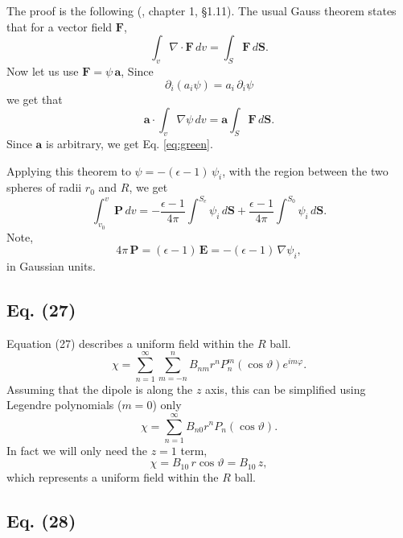 \documentclass[11pt]{article}
\newcommand{\vct}[1]{\boldsymbol{\mathbf{#1}}}
\newcommand{\vE}{\vct{E}}
\newcommand{\vP}{\vct{P}}
\begin{document}
The proof is the following (\cite{arfken}, chapter 1, \S 1.11).
%
The usual Gauss theorem states that
for a vector field $\vct F$,
\begin{equation}
  \int_v \nabla \cdot \vct F \, dv
=
  \int_S \vct F \vct \, d\vct S.
\end{equation}
%
Now let us use $\vct F = \psi \, \vct a$,
Since
\[
  \partial_i (a_i \psi)
= a_i \, \partial_i \psi
\]
we get that
\[
  \vct a \cdot \int_v \nabla \psi \, dv
=
  \vct a \int_S \vct F \vct \, d\vct S.
\]
Since $\vct a$ is arbitrary,
we get Eq. \eqref{eq:green}.

Applying this theorem to $\psi = -(\epsilon - 1) \, \psi_i$,
with the region between the two spheres
of radii $r_0$ and $R$,
we get
\begin{equation}
  \int_{v_0}^v \vP \, dv
=
  -\frac{\epsilon - 1}{4 \pi}
  \int^{S_e} \psi_i \, d\vct S
  +\frac{\epsilon - 1}{4 \pi}
  \int^{S_0} \psi_i \, d\vct S.
\end{equation}
Note,
\[
  4 \pi \, \vP
= (\epsilon - 1) \, \vE
= -(\epsilon - 1) \, \nabla \psi_i,
\]
in Gaussian units.



\subsection{Eq. (27)}



Equation (27) describes a uniform field within the $R$ ball.
\begin{equation}
  \chi
=
  \sum_{n = 1}^\infty
  \sum_{m = -n}^n
  B_{nm} r^n P_n^m(\cos\vartheta)e^{im \varphi}.
  \tag{27}
\end{equation}
%
Assuming that the dipole is along the $z$ axis,
this can be simplified using Legendre polynomials ($m = 0$) only
%
\begin{equation}
  \chi
=
  \sum_{n = 1}^\infty
  B_{n0} r^n P_n(\cos\vartheta).
  \tag{$27'$}
\end{equation}
%
In fact we will only need the $z = 1$ term,
\begin{equation}
  \chi
=
B_{10} \, r \cos\vartheta
=
B_{10} \, z,
  \tag{$27''$}
\end{equation}
%
which represents a uniform field within the $R$ ball.



\subsection{Eq. (28)}
\end{document}
